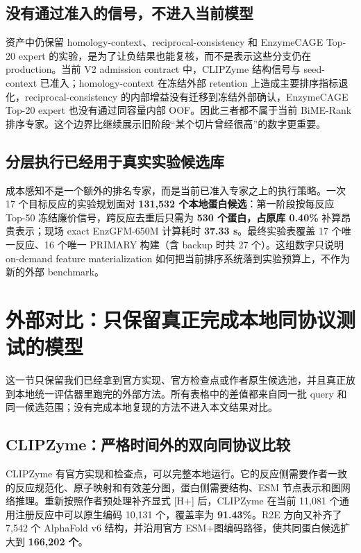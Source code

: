 \documentclass[11pt,a4paper]{ctexart}
\begin{document}
\subsection{没有通过准入的信号，不进入当前模型}

资产中仍保留 homology-context、reciprocal-consistency 和 EnzymeCAGE Top-20 expert 的实验，是为了让负结果也能复核，而不是表示这些分支仍在 production。当前 V2 admission contract 中，CLIPZyme 结构信号与 seed-context 已准入；homology-context 在冻结外部 retention 上造成主要排序指标退化，reciprocal-consistency 的内部增益没有迁移到冻结外部确认，EnzymeCAGE Top-20 expert 也没有通过同容量内部 OOF。因此三者都不属于当前 BiME-Rank 排序专家。这个边界比继续展示旧阶段“某个切片曾经很高”的数字更重要。

\subsection{分层执行已经用于真实实验候选库}

成本感知不是一个额外的排名专家，而是当前已准入专家之上的执行策略。一次 17 个目标反应的实验规划面对 \textbf{131,532 个本地蛋白候选}：第一阶段按每反应 Top-50 冻结廉价信号，跨反应去重后只需为 \textbf{530 个蛋白，占原库 0.40\%} 补算昂贵表示；现场 exact EnzGFM-650M 计算耗时 \textbf{37.33 s}。最终实验表覆盖 17 个唯一反应、16 个唯一 PRIMARY 构建（含 backup 时共 27 个）。这组数字只说明 on-demand feature materialization 如何把当前排序系统落到实验预算上，不作为新的外部 benchmark。

\section{外部对比：只保留真正完成本地同协议测试的模型}

这一节只保留我们已经拿到官方实现、官方检查点或作者原生候选池，并且真正放到本地统一评估器里跑完的外部方法。所有表格中的差值都来自同一批 query 和同一候选范围；没有完成本地复现的方法不进入本文结果对比。

\subsection{CLIPZyme：严格时间外的双向同协议比较}

CLIPZyme\cite{clipzyme2024} 有官方实现和检查点，可以完整本地运行。它的反应侧需要作者一致的反应规范化、原子映射和有效差分图，蛋白侧需要结构、ESM 节点表示和图网络推理。重新按照作者预处理补齐显式 [H+] 后，CLIPZyme 在当前 11,081 个通用注册反应中可以原生编码 10,131 个，覆盖率为 \textbf{91.43\%}。R2E 方向又补齐了 7,542 个 AlphaFold v6 结构，并沿用官方 ESM+图编码路径，使共同蛋白候选扩大到 \textbf{166,202 个}。
\end{document}
